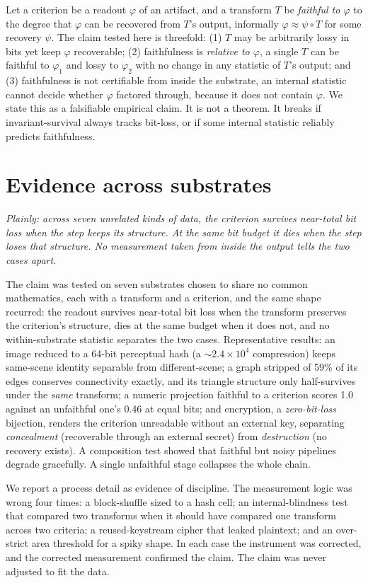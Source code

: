 \documentclass[11pt]{article}
\begin{document}
Let a criterion be a readout $\varphi$ of an artifact, and a transform $T$ be \emph{faithful to $\varphi$} to the degree that $\varphi$ can be recovered from $T$'s output, informally $\varphi \approx \psi \circ T$ for some recovery $\psi$. The claim tested here is threefold: (1) $T$ may be arbitrarily lossy in bits yet keep $\varphi$ recoverable; (2) faithfulness is \emph{relative to $\varphi$}, a single $T$ can be faithful to $\varphi_1$ and lossy to $\varphi_2$ with no change in any statistic of $T$'s output; and (3) faithfulness is not certifiable from inside the substrate, an internal statistic cannot decide whether $\varphi$ factored through, because it does not contain $\varphi$. We state this as a falsifiable empirical claim. It is not a theorem. It breaks if invariant-survival always tracks bit-loss, or if some internal statistic reliably predicts faithfulness.

\section{Evidence across substrates}
\emph{Plainly: across seven unrelated kinds of data, the criterion survives near-total bit loss when the step keeps its structure. At the same bit budget it dies when the step loses that structure. No measurement taken from inside the output tells the two cases apart.}

The claim was tested on seven substrates chosen to share no common mathematics, each with a transform and a criterion, and the same shape recurred: the readout survives near-total bit loss when the transform preserves the criterion's structure, dies at the same budget when it does not, and no within-substrate statistic separates the two cases. Representative results: an image reduced to a 64-bit perceptual hash (a $\sim$$2.4\times10^{4}$ compression) keeps same-scene identity separable from different-scene; a graph stripped of 59\% of its edges conserves connectivity exactly, and its triangle structure only half-survives under the \emph{same} transform; a numeric projection faithful to a criterion scores 1.0 against an unfaithful one's 0.46 at equal bits; and encryption, a \emph{zero-bit-loss} bijection, renders the criterion unreadable without an external key, separating \emph{concealment} (recoverable through an external secret) from \emph{destruction} (no recovery exists). A composition test showed that faithful but noisy pipelines degrade gracefully. A single unfaithful stage collapses the whole chain.

We report a process detail as evidence of discipline. The measurement logic was wrong four times: a block-shuffle sized to a hash cell; an internal-blindness test that compared two transforms when it should have compared one transform across two criteria; a reused-keystream cipher that leaked plaintext; and an over-strict area threshold for a spiky shape. In each case the instrument was corrected, and the corrected measurement confirmed the claim. The claim was never adjusted to fit the data.
\end{document}
